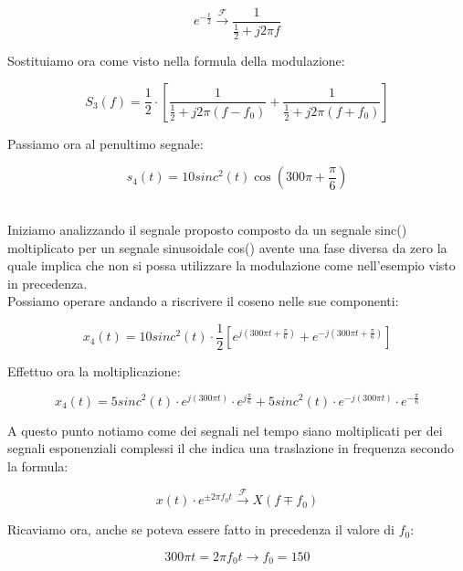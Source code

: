 \documentclass[../main.tex]{subfiles}
\begin{document}
\begin{equation}
	e^{-\frac{t}{2}} \xrightarrow{\mathcal{F}} \frac{1}{\frac{1}{2} + j2\pi f}
\end{equation}

Sostituiamo ora come visto nella formula della modulazione:

\begin{equation}
	S_3(f) = \frac{1}{2} \cdot \left[ \frac{1}{\frac{1}{2} + j2\pi (f - f_0)} + \frac{1}{\frac{1}{2} + j2\pi (f + f_0) }
 \right]
\end{equation}


Passiamo ora al penultimo segnale:

\[s_4(t) = 10\unit{sinc}^2(t)\cos(300\pi + \frac{\pi}{6}) \]\

Iniziamo analizzando il segnale proposto composto da un segnale sinc() moltiplicato per un segnale sinusoidale cos() avente una fase diversa da zero la quale implica che non si possa utilizzare la modulazione come nell'esempio visto in precedenza. \\

Possiamo operare andando a riscrivere il coseno nelle sue componenti:

\begin{equation}
	x_4(t) = 10\unit{sinc}^2(t) \cdot \frac{1}{2} \left[ e^{j(300\pi t + \frac{\pi}{6})} + e^{-j(300\pi t + \frac{\pi}{6})} \right]
\end{equation}

Effettuo ora la moltiplicazione:

\begin{equation}
	x_4(t) = 5\unit{sinc}^2(t) \cdot e^{j(300\pi t)} \cdot e^{j \frac{\pi}{6}} + 5\unit{sinc}^2(t) \cdot e^{-j(300\pi t)} \cdot e^{- \frac{\pi}{6}}
\end{equation}


A questo punto notiamo come dei segnali nel tempo siano moltiplicati per dei segnali esponenziali complessi il che indica una traslazione in frequenza secondo la formula:

\begin{equation}
	x(t)\cdot e^{\pm 2 \pi f_0 t} \xrightarrow{\mathcal{F}}  X(f \mp f_0)
\end{equation}

Ricaviamo ora, anche se poteva essere fatto in precedenza il valore di $f_0$:

\begin{equation}
	300 \pi t = 2\pi f_0 t \rightarrow f_0 = 150
\end{equation}
\end{document}
